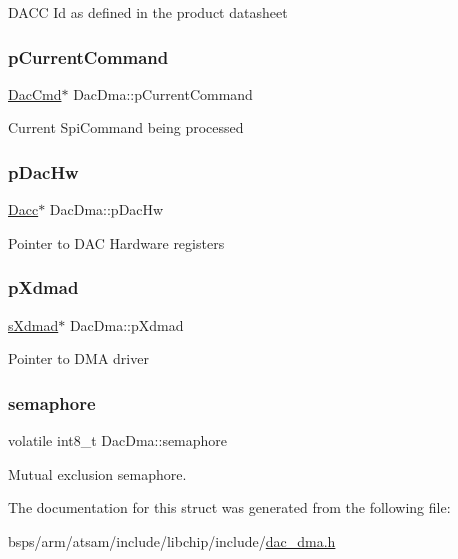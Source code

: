 D\+A\+CC Id as defined in the product datasheet \mbox{\label{structDacDma_a9646e774687b6318934ebc055bc63c40}} 
\subsubsection{\texorpdfstring{pCurrentCommand}{pCurrentCommand}}
{\footnotesize\ttfamily \mbox{\hyperlink{structDacCmd}{Dac\+Cmd}}$\ast$ Dac\+Dma\+::p\+Current\+Command}

Current Spi\+Command being processed \mbox{\label{structDacDma_a95f0888a58dcbe0052b06c77e81cf463}} 
\subsubsection{\texorpdfstring{pDacHw}{pDacHw}}
{\footnotesize\ttfamily \mbox{\hyperlink{structDacc}{Dacc}}$\ast$ Dac\+Dma\+::p\+Dac\+Hw}

Pointer to D\+AC Hardware registers \mbox{\label{structDacDma_a1c31f372640b82948dafbf765e6d957b}} 
\subsubsection{\texorpdfstring{pXdmad}{pXdmad}}
{\footnotesize\ttfamily \mbox{\hyperlink{group__dmad__structs_gaf2c13151514615a6beb35c0d868a5053}{s\+Xdmad}}$\ast$ Dac\+Dma\+::p\+Xdmad}

Pointer to D\+MA driver \mbox{\label{structDacDma_a88d08cd6eaaace55965d20ca53c4a5a4}} 
\subsubsection{\texorpdfstring{semaphore}{semaphore}}
{\footnotesize\ttfamily volatile int8\+\_\+t Dac\+Dma\+::semaphore}

Mutual exclusion semaphore. 

The documentation for this struct was generated from the following file\+:\begin{DoxyCompactItemize}
\item 
bsps/arm/atsam/include/libchip/include/\mbox{\hyperlink{dac__dma_8h}{dac\+\_\+dma.\+h}}\end{DoxyCompactItemize}
